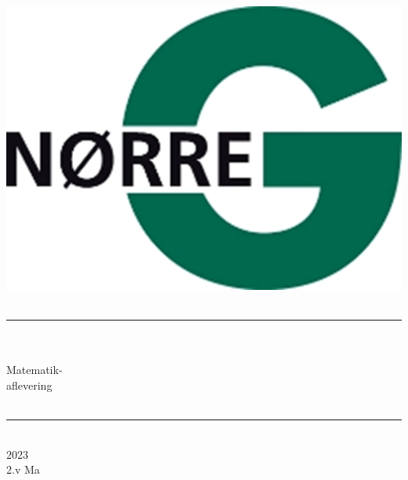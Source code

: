 \documentclass[12pt,x11names,a4paper]{article}
\begin{document}
%

\begin{titlepage}

\begin{minipage}{0.27\textwidth}

\end{minipage}
\begin{minipage}{0.73\textwidth}
\begin{center}
\phantom{h} \vspace{1cm}\\
\hspace{4cm}
\includegraphics[scale = 1]{Billeder/Norreg.png} \\
\phantom{h} \vspace{5cm}\\
\rule{0.7\textwidth}{0.3mm}\\
\phantom{h}\\
{\fontsize{50}{60}\selectfont Matematik-\\aflevering}\\
\phantom{h}\\
\rule{0.7\textwidth}{0.3mm}\\
\Large 2023\\
\Large 2.v Ma

\end{center}
\end{minipage}
\end{titlepage}
\end{document}
